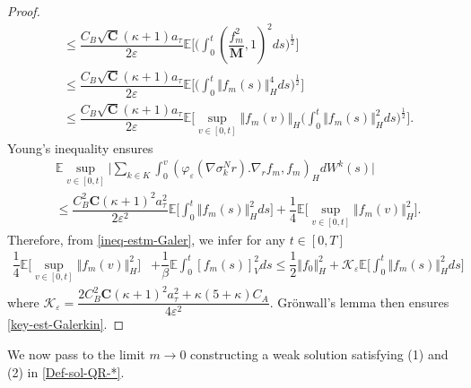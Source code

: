 \documentclass[a4paper,12pt, reqno]{amsart}
\newcommand{\E}{\ensuremath{\mathbb{E}}}
\begin{document}
\begin{proof}
\begin{align*}
  &\leq  \dfrac{C_B\sqrt{\mathbf{C}}(\kappa+1) a_\tau}{2\varepsilon}\E\Big[(\int_0^t(\dfrac{f_m^2}{\mathbf{M}}, 1)^2 ds\big)^{\frac{1}{2}} \Big] \\ 
  &\leq \dfrac{C_B\sqrt{\mathbf{C}}(\kappa+1) a_\tau}{2\varepsilon}\E\Big[(\int_0^t\Vert f_m(s)\Vert_H^4 ds\big)^{\frac{1}{2}} \Big]\\
  &\leq  \dfrac{C_B\sqrt{\mathbf{C}}(\kappa+1) a_\tau}{2\varepsilon}\E\Big[\sup_{v\in[0,t]} \Vert f_m(v)\Vert_H (\int_0^t\Vert f_m(s)\Vert_H^2 ds\big)^{\frac{1}{2}} \Big].
\end{align*} 
Young's inequality ensures
\begin{align*}
     &\E \sup_{v\in[0,t]}   \vert \sum_{k\in K}\int_0^v(\varphi_\varepsilon(\nabla \sigma_k^Nr).\nabla_rf_m ,f_m)_H dW^k(s)\vert \\&\leq  \dfrac{C_B^2\mathbf{C}(\kappa+1)^2 a_\tau^2}{2\varepsilon^2}\E\Big[ \int_0^t\Vert f_m(s)\Vert_H^2 ds \Big]+ \dfrac{1}{4}\E\Big[\sup_{v\in[0,t]} \Vert f_m(v)\Vert_H^2  \Big].
\end{align*}
Therefore, from \eqref{ineq-estm-Galer}, we infer for any $t\in [0,T]$ \begin{align*}
 \dfrac{1}{4}\E\Big[\sup_{v\in[0,t]} \Vert f_m(v)\Vert_H^2  \Big]&+\dfrac{1}{\beta}\E\int_0^t [f_m(s)]_V^2ds\leq \dfrac{1}{2}\Vert f_{0}\Vert_H^2
 +\mathcal{K}_\varepsilon\E\Big[ \int_0^t\Vert f_m(s)\Vert_H^2 ds \Big]
\end{align*}
where $\mathcal{K}_\varepsilon=\dfrac{2C_B^2\mathbf{C}(\kappa+1)^2 a_\tau^2+\kappa (5+\kappa)C_A}{4\varepsilon^2}.$   Grönwall's lemma then ensures \eqref{key-est-Galerkin}. 
\end{proof}

We now pass to the limit $m\rightarrow 0$ constructing a weak solution satisfying (1) and (2) in \autoref{Def-sol-QR-*}.
\end{document}
